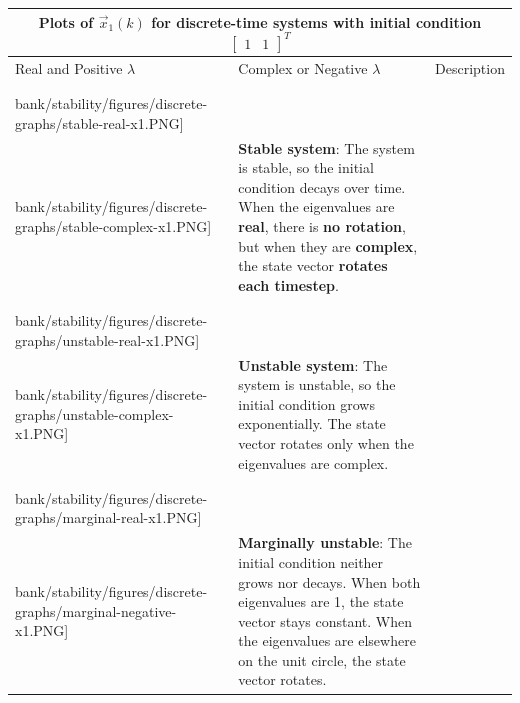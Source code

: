 \begin{tabular}{|p{}| p{}|b{}|}
    \multicolumn{3}{c}{Plots of $\vec{x}_1(k)$ for discrete-time systems with initial condition $\begin{bmatrix} 1 & 1 \end{bmatrix}^T$} \\
    \hline
    Real and Positive $\lambda$ & Complex or Negative $\lambda$ & Description \\
    \hline & & \\
    \texttt{[image: \\bank/stability/figures/discrete-graphs/stable-real-x1.PNG]} &
    \texttt{[image: \\bank/stability/figures/discrete-graphs/stable-complex-x1.PNG]} &
    \textbf{Stable system}: The system is stable, so the initial condition decays over time. When the eigenvalues are \textbf{real}, there is \textbf{no rotation}, but when they are \textbf{complex}, the state vector \textbf{rotates each timestep}. \\
    \hline & & \\
    \texttt{[image: \\bank/stability/figures/discrete-graphs/unstable-real-x1.PNG]} &
    \texttt{[image: \\bank/stability/figures/discrete-graphs/unstable-complex-x1.PNG]} &
    \textbf{Unstable system}: The system is unstable, so the initial condition grows exponentially. The state vector rotates only when the eigenvalues are complex. \\
    \hline & & \\
    \texttt{[image: \\bank/stability/figures/discrete-graphs/marginal-real-x1.PNG]} &
    \texttt{[image: \\bank/stability/figures/discrete-graphs/marginal-negative-x1.PNG]} &
    \textbf{Marginally unstable}: The initial condition neither grows nor decays. When both eigenvalues are 1, the state vector stays constant. When the eigenvalues are elsewhere on the unit circle, the state vector rotates.\\
    \hline
\end{tabular}

